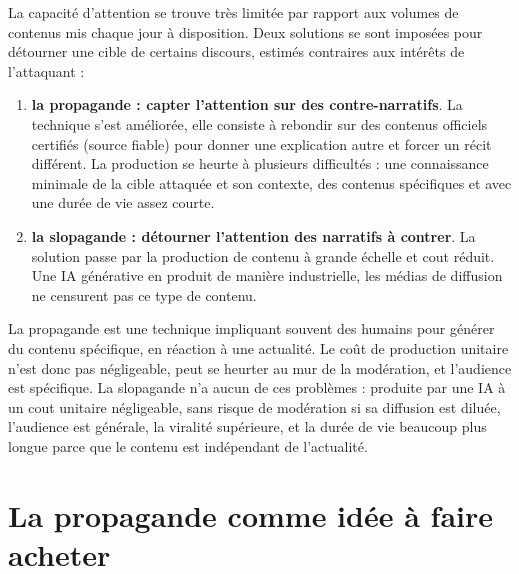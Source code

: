 \documentclass[11pt]{article}
\begin{document}
		
		
		La capacité d'attention se trouve très limitée par rapport aux volumes de contenus mis chaque jour à disposition. Deux solutions se sont imposées pour détourner une cible de certains discours, estimés contraires aux intérêts de l'attaquant : 
		\begin{enumerate}
			\item \textbf{la propagande : capter l'attention sur des contre-narratifs}. La technique s'est améliorée, elle consiste à rebondir sur des contenus officiels certifiés (source fiable) pour donner une explication autre et forcer un récit différent. La production se heurte à plusieurs difficultés : une connaissance minimale de la cible attaquée et son contexte, des contenus spécifiques et avec une durée de vie assez courte. 
			\item \textbf{la slopagande : détourner l'attention des narratifs à contrer}. La solution passe par la production de contenu à grande échelle et cout réduit. Une IA générative en produit de manière industrielle, les médias de diffusion ne censurent pas ce type de contenu. 
		\end{enumerate}
		
		La propagande est une technique impliquant souvent des humains pour générer du contenu spécifique, en réaction à une actualité. Le coût de production unitaire n'est donc pas négligeable, peut se heurter au mur de la modération, et l'audience est spécifique. La slopagande n'a aucun de ces problèmes : produite par une IA à un cout unitaire négligeable, sans risque de modération si sa diffusion est diluée, l'audience est générale, la viralité supérieure, et la durée de vie beaucoup plus longue parce que le contenu est indépendant de l'actualité. 
		
		
		
	\section{La propagande comme idée à faire acheter}
		
\end{document}
